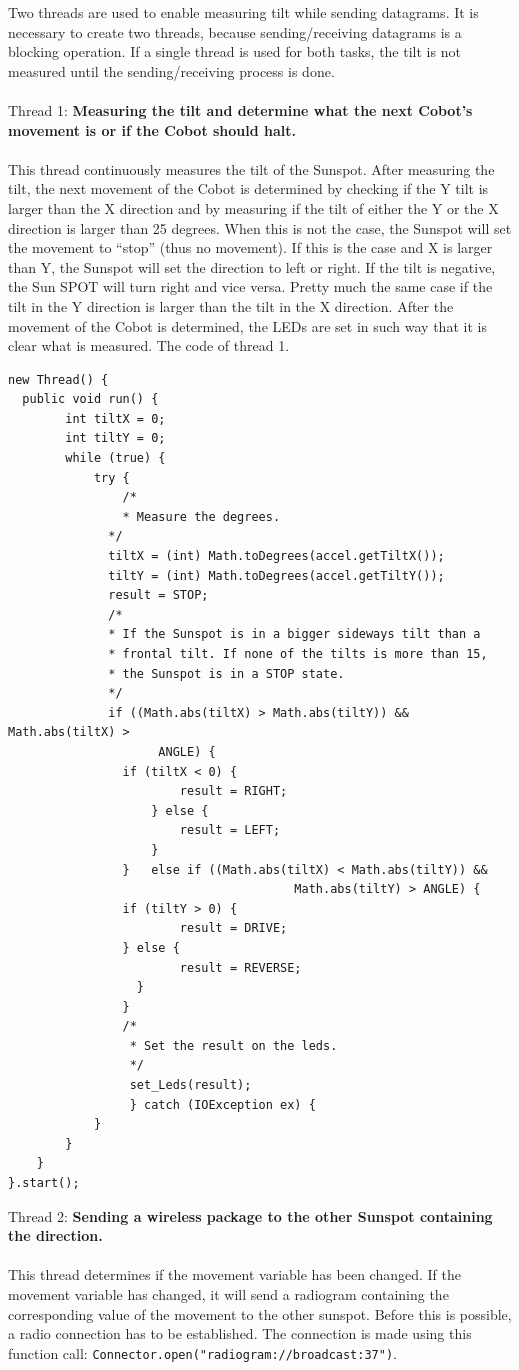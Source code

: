 \documentclass[a4paper,10pt]{article} %
\begin{document}
Two threads are used to enable measuring tilt while sending datagrams. It is
necessary to create two threads, because sending/receiving datagrams is a
blocking operation. If a single thread is used for both tasks, the tilt is not
measured until the sending/receiving process is done.
\\
\\
\noindent Thread 1: \textbf{Measuring the tilt and determine what the next Cobot's
movement is or if the Cobot should halt.}
\\
\\
This thread continuously measures the tilt of the Sunspot. After measuring the
tilt, the next movement of the Cobot is determined by checking if the Y tilt is
larger than the X direction and by measuring if the tilt of either the Y or the
X direction is larger than 25 degrees. When this is not the case, the Sunspot
will set the movement to ``stop'' (thus no movement). If this is the case and X
is larger than Y, the Sunspot will set the direction to left or right. If the
tilt is negative, the Sun SPOT will turn right and vice versa.  Pretty much the
same case if the tilt in the Y direction is larger than the tilt in the X
direction. After the movement of the Cobot is determined, the LEDs are set in
such way that it is clear what is measured.
The code of thread 1.
\begin{verbatim}
new Thread() {
  public void run() {
		int tiltX = 0;
		int tiltY = 0;
		while (true) {
		  	try {
		    	/*
		    	* Measure the degrees.
		      */
		      tiltX = (int) Math.toDegrees(accel.getTiltX());
		      tiltY = (int) Math.toDegrees(accel.getTiltY());
		      result = STOP;
		      /*
		      * If the Sunspot is in a bigger sideways tilt than a
		      * frontal tilt. If none of the tilts is more than 15,
		      * the Sunspot is in a STOP state.
		      */
		      if ((Math.abs(tiltX) > Math.abs(tiltY)) && Math.abs(tiltX) >
		      		 ANGLE) {
		      	if (tiltX < 0) {
		      			result = RIGHT;
		 	     	} else {
		       			result = LEFT;
			     	}
		  		}	else if ((Math.abs(tiltX) < Math.abs(tiltY)) && 
		  								Math.abs(tiltY) > ANGLE) {
		      	if (tiltY > 0) {
		        		result = DRIVE;
		        } else {
		        		result = REVERSE;
		          }
		        }
		        /*
		         * Set the result on the leds.
		         */
		         set_Leds(result);
		         } catch (IOException ex) {
		    }
		}  
	}
}.start();
\end{verbatim}
\noindent Thread 2: \textbf{Sending a wireless package to the other Sunspot
containing the direction.}
\\
\\
This thread determines if the movement variable has been changed. If the
movement variable has changed, it will send a radiogram containing the
corresponding value of the movement to the other sunspot. Before this is
possible, a radio connection has to be established. The connection is made using
this function call: \texttt{Connector.open("radiogram://broadcast:37")}.
\end{document}
